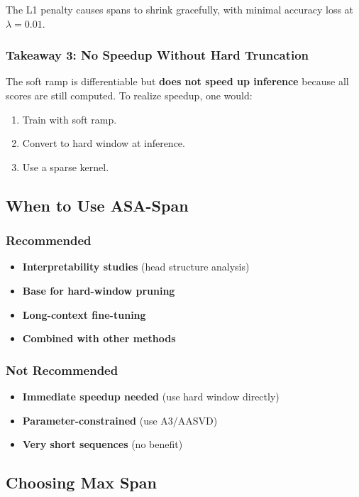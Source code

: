 The L1 penalty causes spans to shrink gracefully, with minimal accuracy loss 
at $\lambda = 0.01$.

\subsubsection{Takeaway 3: No Speedup Without Hard Truncation}

The soft ramp is differentiable but \textbf{does not speed up inference} because 
all scores are still computed. To realize speedup, one would:
\begin{enumerate}
\item Train with soft ramp.
\item Convert to hard window at inference.
\item Use a sparse kernel.

\end{enumerate}
\subsection{When to Use ASA-Span}

\subsubsection{Recommended}

\begin{itemize}
\item \textbf{Interpretability studies} (head structure analysis)
\item \textbf{Base for hard-window pruning}
\item \textbf{Long-context fine-tuning}
\item \textbf{Combined with other methods}

\end{itemize}
\subsubsection{Not Recommended}

\begin{itemize}
\item \textbf{Immediate speedup needed} (use hard window directly)
\item \textbf{Parameter-constrained} (use A3/AASVD)
\item \textbf{Very short sequences} (no benefit)

\end{itemize}
\subsection{Choosing Max Span}

